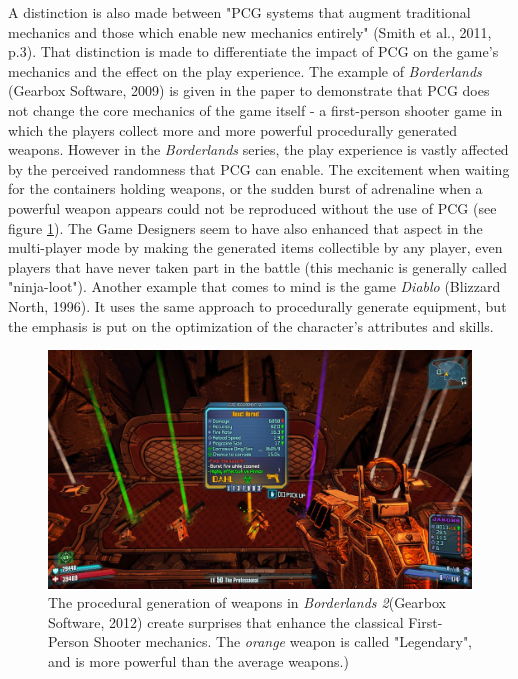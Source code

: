 A distinction is also made between "PCG systems that augment traditional mechanics and those which enable new mechanics entirely" (Smith et al., 2011, p.3)\cite{pdf:pcgbased}. That distinction is made to differentiate the impact of PCG on the game's mechanics and the effect on the play experience. The example of \textit{Borderlands} (Gearbox Software, 2009)\cite{game:border} is given in the paper to demonstrate that PCG does not change the core mechanics of the game itself - a first-person shooter game in which the players collect more and more powerful procedurally generated weapons. However in the \textit{Borderlands} series, the play experience is vastly affected by the perceived randomness that PCG can enable. The excitement when waiting for the containers holding weapons, or the sudden burst of adrenaline when a powerful weapon appears could not be reproduced without the use of PCG (see figure \ref{fig:Bl2}). The Game Designers seem to have also enhanced that aspect in the multi-player mode by making the generated items collectible by any player, even players that have never taken part in the battle (this mechanic is generally called "ninja-loot"). Another example that comes to mind is the game \textit{Diablo} (Blizzard North, 1996)\cite{game:diablo}. It uses the same approach to procedurally generate equipment, but the emphasis is put on the optimization of the character's attributes and skills. 

\begin{figure}[!ht]
    \centering
    \includegraphics[scale=0.15]{Images/Borderlands2.jpg}
    \caption{The procedural generation of weapons in \textit{Borderlands 2}(Gearbox Software, 2012) create surprises that enhance the classical First-Person Shooter mechanics. The \textit{orange} weapon is called "Legendary", and is more powerful than the average weapons.)}
    \label{fig:Bl2}
\end{figure}

